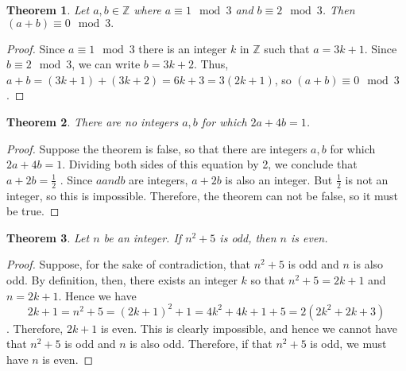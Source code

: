 \documentclass[8pt]{extarticle}
\newtheorem{theorem}{Theorem}
\begin{document}
  \begin{theorem}
      Let $a, b \in \mathbb{Z}$ where $a \equiv 1 \mod{3}$ and $b \equiv 2 \mod{3}$. Then 
      $(a+b) \equiv 0 \mod{3}.$
  \end{theorem}
  \begin{proof}
      Since $a \equiv 1 \mod{3}$ there is an integer $k$ in $\mathbb{Z}$ such that 
      $a=3k+1$. Since $b \equiv 2 \mod{3}$, we can write $b=3k+2$. Thus, $a+b=(3k+1)+(3k+2)=6k+3=3(2k+1)$,
      so $(a+b) \equiv 0 \mod{3}$.
  \end{proof}

  \begin{theorem}
      There are no integers $a, b$ for which $2a + 4b = 1$.
  \end{theorem}
  \begin{proof}
      Suppose the theorem is false, so that there are integers $a, b$ for which $2a + 4b = 1$. Dividing both sides of this equation by 2, we conclude that $a + 2b = \displaystyle \frac{1}{2}$ . Since $a and b$ are integers, $a + 2b$ is also an integer. But $\displaystyle \frac{1}{2}$ is not an integer, so this is impossible. Therefore, the theorem can not be false, so it must be true.
  \end{proof}

  \begin{theorem}
      Let $n$ be an integer. If $n^2 + 5$ is odd, then $n$ is even.
  \end{theorem}
  \begin{proof}
      Suppose, for the sake of contradiction, that $n^2+5$ is odd and $n$ is also odd. By definition,
  then, there exists  an integer $k$ so that $n^2+5=2k+1$ and $n=2k+1$. Hence we have
  $$ 2k+1=n^2+5=(2k+1)^2+1=4k^2+4k+1+5=2(2k^2+2k+3)$$.
  Therefore, $2k+1$ is even. This is clearly impossible, and hence we cannot have that $n^2 + 5$ is odd and $n$ is also odd.
  Therefore, if that $n^2 + 5$ is odd, we must have $n$ is even.
  \end{proof}
\end{document}
